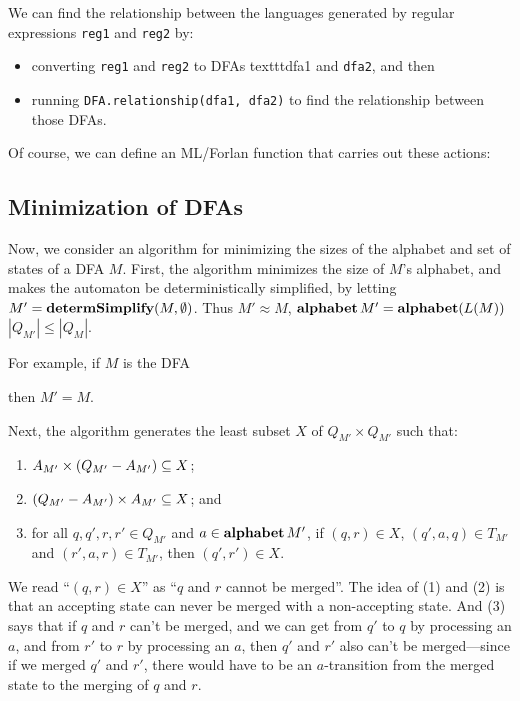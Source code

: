 We can find the relationship between the languages generated by regular
expressions \texttt{reg1} and \texttt{reg2} by:
\begin{itemize}
\item  converting \texttt{reg1} and \texttt{reg2} to DFAs
texttt{dfa1} and \texttt{dfa2}, and then

\item  running \texttt{DFA.relationship(dfa1, dfa2)} to find
the relationship between those DFAs.
\end{itemize}

Of course, we can define an ML/Forlan function that
carries out these actions:


\subsection{Minimization of DFAs}

Now, we consider an algorithm for minimizing the sizes of the alphabet
and set of states of a DFA $M$.  First, the algorithm minimizes the
size of $M$'s alphabet, and makes the automaton be deterministically
simplified, by letting $M'=\mathbf{determSimplify}(M,\emptyset)$.  Thus
$M'\approx M$, $\mathbf{alphabet}\,M'=\mathbf{alphabet}(L(M))$ $|Q_{M'}|\leq|Q_M|$.

For example, if $M$ is the DFA
\begin{center}

\end{center}
then $M'=M$.

Next, the algorithm generates the least subset $X$ of $Q_{M'}\times
Q_{M'}$ such that:
\begin{enumerate}[\quad(1)]
\item $A_{M'}\times(Q_{M'}-A_{M'})\subseteq X$;

\item $(Q_{M'}-A_{M'})\times A_{M'}\subseteq X$; and

\item for all $q,q',r,r'\in Q_{M'}$ and $a\in\mathbf{alphabet}\,M'$,
if $(q,r)\in X$, $(q',a, q)\in T_{M'}$ and $(r',a, r)\in T_{M'}$, then
$(q',r')\in X$.
\end{enumerate}
We read ``$(q,r)\in X$'' as ``$q$ and $r$ cannot be merged''.
The idea of (1) and (2) is that an accepting state can never be merged
with a non-accepting state.  And (3) says that if $q$ and $r$ can't
be merged, and we can get from $q'$ to $q$ by processing an $a$, and
from $r'$ to $r$ by processing an $a$, then
$q'$ and $r'$ also can't be merged---since if we merged $q'$ and $r'$,
there would have to be an $a$-transition from the merged state
to the merging of $q$ and $r$.

